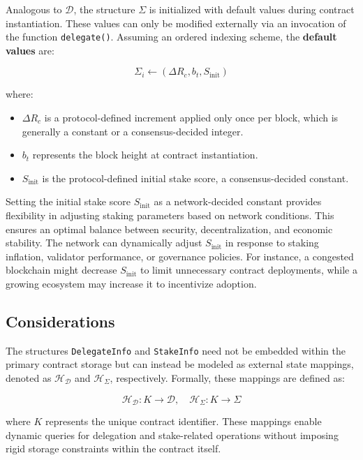 \documentclass{article}
\begin{document}
Analogous to $\mathcal{D}$, the structure $\Sigma$ is initialized with default values during contract instantiation. These values can only be modified externally via an invocation of the function \texttt{delegate()}. Assuming an ordered indexing scheme, the \textbf{default values} are:

\begin{equation}
\Sigma_i \gets (\Delta R_c, b_t, S_{\text{init}})
\end{equation}

where:
\begin{itemize}
    \item $\Delta R_c$ is a protocol-defined increment applied only once per block, which is generally a constant or a consensus-decided integer.
    \item $b_t$ represents the block height at contract instantiation.
    \item \( S_{\text{init}} \) is the protocol-defined initial stake score, a consensus-decided constant.
\end{itemize}

Setting the initial stake score \( S_{\text{init}} \) as a network-decided constant provides flexibility in adjusting staking parameters based on network conditions. This ensures an optimal balance between security, decentralization, and economic stability. The network can dynamically adjust \( S_{\text{init}} \) in response to staking inflation, validator performance, or governance policies. For instance, a congested blockchain might decrease \( S_{\text{init}} \) to limit unnecessary contract deployments, while a growing ecosystem may increase it to incentivize adoption. 

\subsection{Considerations}  

The structures \texttt{DelegateInfo} and \texttt{StakeInfo} need not be embedded within the primary contract storage but can instead be modeled as external state mappings, denoted as $\mathcal{H}_\mathcal{D}$ and $\mathcal{H}_\Sigma$, respectively. Formally, these mappings are defined as:

\begin{equation}
\mathcal{H}_\mathcal{D}: K \to \mathcal{D}, \quad \mathcal{H}_\Sigma: K \to \Sigma
\end{equation}

where $K$ represents the unique contract identifier. These mappings enable dynamic queries for delegation and stake-related operations without imposing rigid storage constraints within the contract itself.
\end{document}
